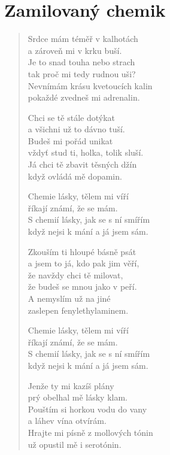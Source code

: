 \section{Zamilovaný chemik}

\thispagestyle{empty}

\begin{multicols}{2}
	
	\begin{verse}
		
		
		Srdce mám téměř v kalhotách\\
		a zároveň mi v krku buší.\\
		Je to snad touha nebo strach\\
		tak proč mi tedy rudnou uši?\\
		Nevnímám krásu kvetoucích kalin\\
		pokaždé zvedneš mi adrenalin.
		
		Chci se tě stále dotýkat\\
		a všichni už to dávno tuší.\\
		Budeš mi pořád unikat\\
		vždyť stud ti, holka, tolik sluší.\\
		Já chci tě zbavit těsných džín\\
		když ovládá mě dopamin.
		
		Chemie lásky, tělem mi víří\\
		říkají známí, že se mám.\\
		S chemií lásky, jak se s ní smířím\\
		když nejsi k mání a já jsem sám.
		
		Zkouším ti hloupé básně psát\\
		a jsem to já, kdo pak jim věří,\\
		že navždy chci tě milovat,\\
		že budeš se mnou jako v peří.\\
		A nemyslím už na jiné\\
		zaslepen fenylethylaminem.
		
		\columnbreak
		
		Chemie lásky, tělem mi víří\\
		říkají známí, že se mám.\\
		S chemií lásky, jak se s ní smířím\\
		když nejsi k mání a já jsem sám.
		
		Jenže ty mi kazíš plány\\
		prý obelhal mě lásky klam.\\
		Pouštím si horkou vodu do vany\\
		a láhev vína otvírám.\\
		Hrajte mi písně z mollových tónin\\
		už opustil mě i serotónin.
	\end{verse}
	
\end{multicols}